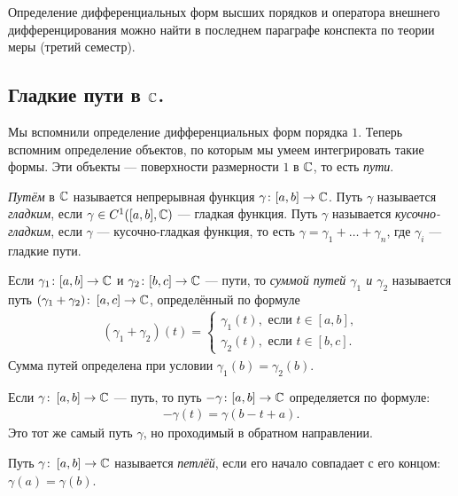 \documentclass[../complex-analysis.tex]{subfiles}
\begin{document}
Определение дифференциальных форм высших порядков и оператора внешнего дифференцирования можно найти в последнем параграфе конспекта по теории меры (третий семестр).

\subsection{Гладкие пути в \texorpdfstring{$\mathbb{C}$}{комплексной плоскости}.}

Мы вспомнили определение дифференциальных форм порядка $1$. Теперь вспомним определение объектов, по которым мы умеем интегрировать такие формы. Эти объекты --- поверхности размерности $1$ в $\mathbb{C}$, то есть \textit{пути}.

\begin{df}[путь]
 \emph{Путём} в $\mathbb{C}$ называется непрерывная функция $\gamma \colon [a,b] \to \mathbb{C}$. Путь $\gamma$ называется \textit{гладким}, если $\gamma \in C^{1}([a,b],\mathbb{C})$ --- гладкая функция. Путь $\gamma$ называется \textit{кусочно-гладким}, если $\gamma$ --- кусочно-гладкая функция, то есть $\gamma = \gamma_1 + \ldots + \gamma_n$, где $\gamma_i$ --- гладкие пути.
\end{df}

\begin{df}
 Если $\gamma_1 \colon [a,b] \to \mathbb{C}$ и $\gamma_2 \colon [b,c] \to \mathbb{C}$ --- пути, то \textit{суммой путей $\gamma_1$ и $\gamma_2$} называется путь $(\gamma_1 + \gamma_2)\colon\, [a,c] \to \mathbb{C}$, определённый по формуле
 \begin{align*}
  (\gamma_1 + \gamma_2)(t) = \begin{cases}
   \gamma_1(t), \text{ если } t \in [a,b],  \\
   \gamma_2(t), \text{ если } t \in [b,c].
  \end{cases} 
 \end{align*} Сумма путей определена при условии $\gamma_1(b) = \gamma_2(b)$.
\end{df}

\begin{notatn}
 Если $\gamma \colon\, [a,b] \to \mathbb{C}$ --- путь, то путь $-\gamma \colon [a,b] \to \mathbb{C}$ определяется по формуле:
 \begin{align*}
  -\gamma(t) = \gamma(b - t + a).
 \end{align*} Это тот же самый путь $ \gamma $, но проходимый в обратном направлении.
\end{notatn}

\begin{df}
 Путь $ \gamma \colon\, [a,b]\to\mathbb{C} $ называется \emph{петлёй}, если его начало совпадает с его концом: $ \gamma(a)=\gamma(b) $.
\end{df}
\end{document}
